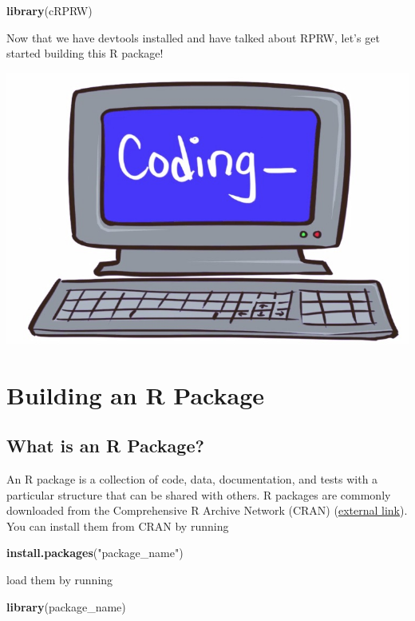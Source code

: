 \documentclass[
]{book}
\newenvironment{Shaded}{\begin{snugshade}}{\end{snugshade}}
\newcommand{\KeywordTok}[1]{\textcolor[rgb]{0.13,0.29,0.53}{\textbf{#1}}}
\newcommand{\NormalTok}[1]{#1}
\newcommand{\StringTok}[1]{\textcolor[rgb]{0.31,0.60,0.02}{#1}}
\begin{document}
\begin{Shaded}
\begin{Highlighting}[]
\KeywordTok{library}\NormalTok{(cRPRW)}
\end{Highlighting}
\end{Shaded}

Now that we have devtools installed and have talked about RPRW, let's get started building this R package!

\begin{center}\includegraphics[width=0.5\linewidth]{images/coding} \end{center}

\hypertarget{r-package}{%
\chapter{Building an R Package}\label{r-package}}

\hypertarget{what-is-an-r-package}{%
\section{What is an R Package?}\label{what-is-an-r-package}}

An R package is a collection of code, data, documentation, and tests with a particular structure that can be shared with others. R packages are commonly downloaded from the Comprehensive R Archive Network (CRAN) (\href{https://cran.r-project.org/}{external link}). You can install them from CRAN by running

\begin{Shaded}
\begin{Highlighting}[]
\KeywordTok{install.packages}\NormalTok{(}\StringTok{"package_name"}\NormalTok{)}
\end{Highlighting}
\end{Shaded}

load them by running

\begin{Shaded}
\begin{Highlighting}[]
\KeywordTok{library}\NormalTok{(package_name)}
\end{Highlighting}
\end{Shaded}
\end{document}
